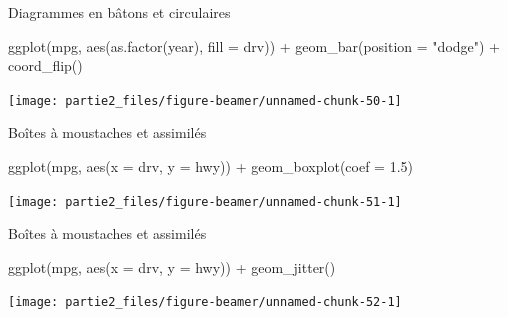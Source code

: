 \documentclass[12pt,ignorenonframetext,]{beamer}
\newenvironment{Shaded}{}{}
\newcommand{\KeywordTok}[1]{\textcolor[rgb]{0.00,0.00,1.00}{#1}}
\newcommand{\DataTypeTok}[1]{#1}
\newcommand{\FloatTok}[1]{#1}
\newcommand{\StringTok}[1]{\textcolor[rgb]{0.00,0.50,0.50}{#1}}
\newcommand{\OperatorTok}[1]{#1}
\newcommand{\NormalTok}[1]{#1}
\renewenvironment{Shaded}{\begin{snugshade}}{\end{snugshade}}
\begin{document}
\begin{frame}[fragile]{Diagrammes en bâtons et circulaires}

\footnotesize \center

\begin{Shaded}
\begin{Highlighting}[]
\KeywordTok{ggplot}\NormalTok{(mpg, }\KeywordTok{aes}\NormalTok{(}\KeywordTok{as.factor}\NormalTok{(year), }\DataTypeTok{fill =}\NormalTok{ drv)) }\OperatorTok{+}\StringTok{ }
\StringTok{  }\KeywordTok{geom_bar}\NormalTok{(}\DataTypeTok{position =} \StringTok{"dodge"}\NormalTok{) }\OperatorTok{+}\StringTok{ }
\StringTok{  }\KeywordTok{coord_flip}\NormalTok{()}
\end{Highlighting}
\end{Shaded}

\texttt{[image: partie2\_files/figure-beamer/unnamed-chunk-50-1]}

\end{frame}

\begin{frame}[fragile]{Boîtes à moustaches et assimilés}

\footnotesize \center

\begin{Shaded}
\begin{Highlighting}[]
\KeywordTok{ggplot}\NormalTok{(mpg, }\KeywordTok{aes}\NormalTok{(}\DataTypeTok{x =}\NormalTok{ drv, }\DataTypeTok{y =}\NormalTok{ hwy)) }\OperatorTok{+}\StringTok{ }
\StringTok{  }\KeywordTok{geom_boxplot}\NormalTok{(}\DataTypeTok{coef =} \FloatTok{1.5}\NormalTok{)}
\end{Highlighting}
\end{Shaded}

\texttt{[image: partie2\_files/figure-beamer/unnamed-chunk-51-1]}

\end{frame}

\begin{frame}[fragile]{Boîtes à moustaches et assimilés}

\footnotesize \center

\begin{Shaded}
\begin{Highlighting}[]
\KeywordTok{ggplot}\NormalTok{(mpg, }\KeywordTok{aes}\NormalTok{(}\DataTypeTok{x =}\NormalTok{ drv, }\DataTypeTok{y =}\NormalTok{ hwy)) }\OperatorTok{+}\StringTok{ }
\StringTok{  }\KeywordTok{geom_jitter}\NormalTok{()}
\end{Highlighting}
\end{Shaded}

\texttt{[image: partie2\_files/figure-beamer/unnamed-chunk-52-1]}

\end{frame}
\end{document}
